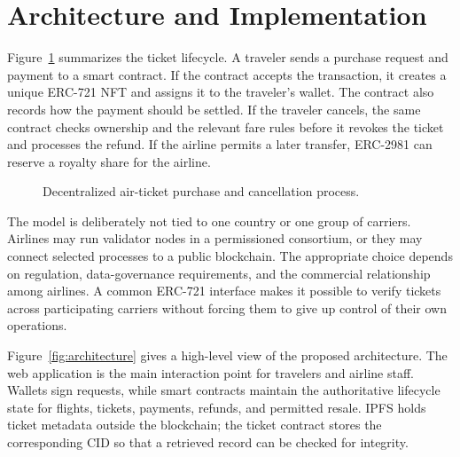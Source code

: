 \documentclass[conference]{IEEEtran}
\begin{document}
\section{Architecture and Implementation}
Figure~\ref{fig:lifecycle} summarizes the ticket lifecycle. A traveler sends a purchase request and payment to a smart contract. If the contract accepts the transaction, it creates a unique ERC-721 NFT and assigns it to the traveler's wallet. The contract also records how the payment should be settled. If the traveler cancels, the same contract checks ownership and the relevant fare rules before it revokes the ticket and processes the refund. If the airline permits a later transfer, ERC-2981 can reserve a royalty share for the airline.

\begin{figure}[!t]
\centering
{}
\caption{Decentralized air-ticket purchase and cancellation process.}
\label{fig:lifecycle}
\end{figure}

The model is deliberately not tied to one country or one group of carriers. Airlines may run validator nodes in a permissioned consortium, or they may connect selected processes to a public blockchain. The appropriate choice depends on regulation, data-governance requirements, and the commercial relationship among airlines. A common ERC-721 interface makes it possible to verify tickets across participating carriers without forcing them to give up control of their own operations.

Figure~\ref{fig:architecture} gives a high-level view of the proposed architecture. The web application is the main interaction point for travelers and airline staff. Wallets sign requests, while smart contracts maintain the authoritative lifecycle state for flights, tickets, payments, refunds, and permitted resale. IPFS holds ticket metadata outside the blockchain; the ticket contract stores the corresponding CID so that a retrieved record can be checked for integrity.
\end{document}
